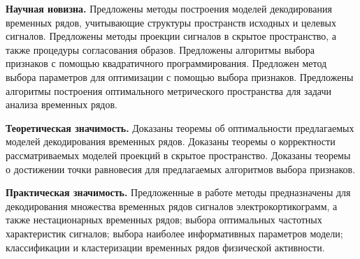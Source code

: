 \vspace{0.5cm}
\textbf{Научная новизна.}
Предложены методы построения моделей декодирования временных рядов, учитывающие структуры пространств исходных и целевых сигналов.
Предложены методы проекции сигналов в скрытое пространство, а также процедуры согласования образов.
Предложены алгоритмы выбора признаков с помощью квадратичного программирования.
Предложен метод выбора параметров для оптимизации с помощью выбора признаков.
Предложены алгоритмы построения оптимального метрического пространства для задачи анализа временных рядов.

\vspace{0.5cm}
\textbf{Теоретическая значимость.}
Доказаны теоремы об оптимальности предлагаемых моделей декодирования временных рядов.
Доказаны теоремы о корректности рассматриваемых моделей проекций в скрытое пространство.
Доказаны теоремы о достижении точки равновесия для предлагаемых алгоритмов выбора признаков. 

\vspace{0.5cm}
\textbf{Практическая значимость.}
Предложенные в работе методы предназначены для декодирования множества временных рядов сигналов электрокортикограмм, а также нестационарных временных рядов; выбора оптимальных частотных характеристик сигналов; выбора наиболее информативных параметров модели; классификации и кластеризации временных рядов физической активности.

